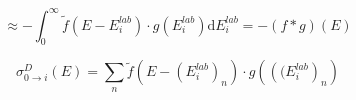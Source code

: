 \documentclass{article}
\begin{document}
\begin{equation}
\label{convolution_approximation_3}
	\approx - \int_{0}^{\infty} \tilde{f}\left( E - E^{lab}_i \right) \cdot g \left( E^{lab}_i \right) \mathrm{d} E_i^{lab} = -\left( f * g \right) \left( E \right)
\end{equation}

\begin{equation}
\label{discrete_convolution}
	\sigma^{D}_{0 \to i} (E) = \sum_n \tilde{f} \left( E -  \left(E^{lab}_i\right)_n \right) \cdot g \left( \left( (E^{lab}_i\right)_n \right)
\end{equation}
\newpage

{}

\end{document}

